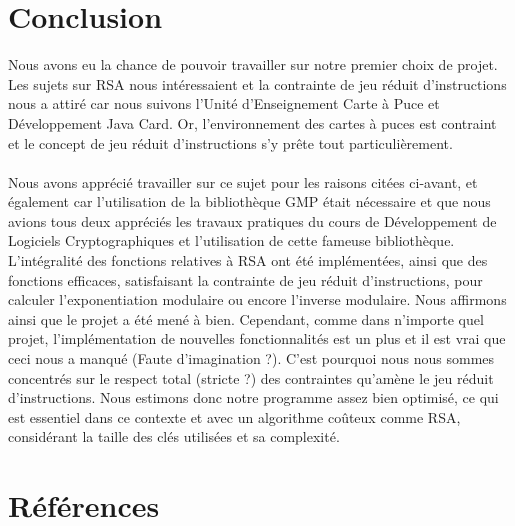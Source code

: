 \documentclass[12pt]{article}
\theoremstyle{remark}\newtheorem{note}{Note}
\theoremstyle{remark}\newtheorem{nota}{Notation}
\theoremstyle{definition}
\begin{document}
\section*{Conclusion}

Nous avons eu la chance de pouvoir travailler sur notre premier choix de projet. Les sujets sur RSA nous intéressaient et la contrainte de jeu réduit d'instructions nous a attiré car nous suivons l'Unité d'Enseignement Carte à Puce et Développement Java Card. Or, l'environnement des cartes à puces est contraint et le concept de jeu réduit d'instructions s'y prête tout particulièrement.\\
\\
Nous avons apprécié travailler sur ce sujet pour les raisons citées ci-avant, et également car l'utilisation de la bibliothèque GMP était nécessaire et que nous avions tous deux appréciés les travaux pratiques du cours de Développement de Logiciels Cryptographiques et l'utilisation de cette fameuse bibliothèque.\\
L'intégralité des fonctions relatives à RSA ont été implémentées, ainsi que des fonctions efficaces, satisfaisant la contrainte de jeu réduit d'instructions, pour calculer l'exponentiation modulaire ou encore l'inverse modulaire. Nous affirmons ainsi que le projet a été mené à bien. Cependant, comme dans n'importe quel projet, l'implémentation de nouvelles fonctionnalités est un plus et il est vrai que ceci nous a manqué (Faute d'imagination ?). C'est pourquoi nous nous sommes concentrés sur le respect total (stricte ?) des contraintes qu'amène le jeu réduit d'instructions. Nous estimons donc notre programme assez bien optimisé, ce qui est essentiel dans ce contexte et avec un algorithme coûteux comme RSA, considérant la taille des clés utilisées et sa complexité.



\pagebreak
\section*{Références}
\end{document}
